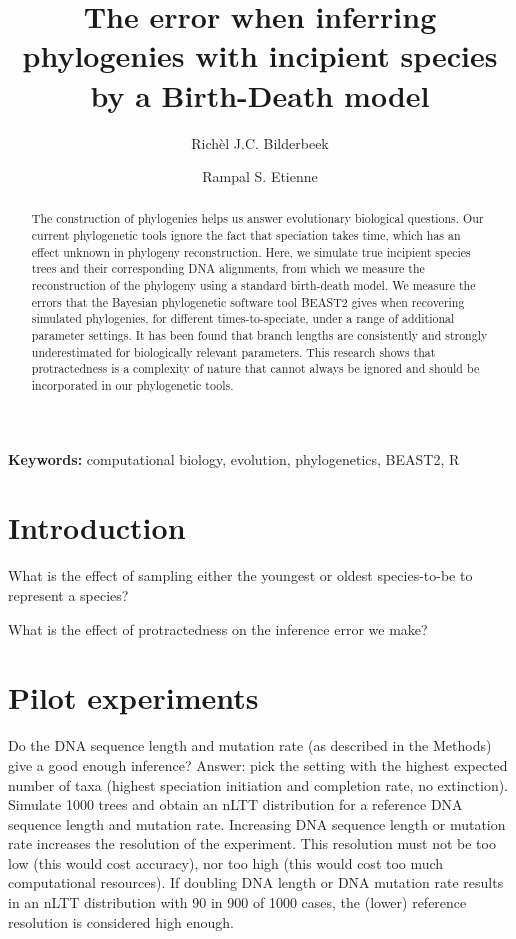 \documentclass{article}
\title{The error when inferring phylogenies with incipient species by a Birth-Death model}
\author[1]{Rich\`el J.C. Bilderbeek}
\author[1]{Rampal S. Etienne}
\affil[1]{Groningen Institute for Evolutionary Life Sciences, University of Groningen, Groningen, The Netherlands}
\begin{document}
\maketitle

\begin{abstract}

  The construction of phylogenies helps us answer evolutionary biological
  questions.
  Our current phylogenetic tools ignore the fact that speciation takes time,
  which has an effect unknown in phylogeny reconstruction.
  Here, we simulate true incipient species trees and their corresponding
  DNA alignments, from which we measure the reconstruction of the phylogeny
  using a standard birth-death model.
  We measure the errors that the Bayesian phylogenetic software tool BEAST2
  gives when recovering simulated phylogenies, for different times-to-speciate,
  under a range of additional parameter settings.
  It has been found that branch lengths are consistently and strongly 
  underestimated for biologically relevant parameters.
  This research shows that protractedness is a complexity of nature that
  cannot always be ignored and should be incorporated in our phylogenetic
  tools.

\end{abstract}

{\bf Keywords:} computational biology, evolution, phylogenetics, BEAST2, R

\section{Introduction}

What is the effect of sampling either the youngest or oldest species-to-be
to represent a species?

What is the effect of protractedness on the inference error we make?

\section{Pilot experiments}

Do the DNA sequence length and mutation rate (as described in the Methods)
give a good enough inference? Answer: pick the setting with the highest
expected number of taxa (highest speciation initiation and completion rate, 
no extinction). Simulate 1000 trees and obtain an nLTT distribution for a
reference DNA sequence length and mutation rate. Increasing DNA sequence length
or mutation rate increases the resolution of the experiment. This resolution
must not be too low (this would cost accuracy), nor too high (this would cost
too much computational resources). If doubling DNA length or DNA mutation rate
results in an nLTT distribution with 90%
in 900 of 1000 cases, the (lower) reference resolution is considered high enough.
\end{document}

